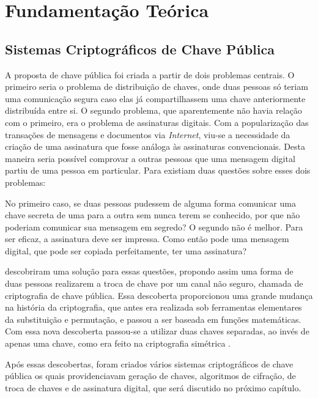 \chapter[Fundamentação Teórica]{Fundamentação Teórica}
\section{Sistemas Criptográficos de Chave Pública}

A proposta de chave pública foi criada a partir de dois problemas centrais. O primeiro seria o problema de distribuição de chaves, onde duas pessoas só teriam uma comunicação segura caso elas já compartilhassem uma chave anteriormente distribuída entre si. O segundo problema, que aparentemente não havia relação com o primeiro, era o problema de assinaturas digitais. Com a popularização das transações de mensagens e documentos via \textit{Internet}, viu-se a necessidade da criação de uma assinatura que fosse análoga às assinaturas convencionais. Desta maneira seria possível comprovar a outras pessoas que uma mensagem digital partiu de uma pessoa em particular. Para  existiam duas questões sobre esses dois problemas:

\begin{citacao}
No primeiro caso, se duas pessoas pudessem de alguma forma comunicar uma chave secreta de uma para a outra sem nunca terem se conhecido, por que não poderiam comunicar sua mensagem em segredo? O segundo não é melhor. Para ser eficaz, a assinatura deve ser impressa. Como então pode uma mensagem digital, que pode ser copiada perfeitamente, ter uma assinatura?
\end{citacao}

 descobriram uma solução para essas questões, propondo assim uma forma de duas pessoas realizarem a troca de chave por um canal não seguro, chamada de criptografia de chave pública. Essa descoberta proporcionou uma grande mudança na história da criptografia, que antes era realizada sob ferramentas elementares da substituição e permutação, e passou a ser baseada em funções matemáticas. Com essa nova descoberta passou-se a utilizar duas chaves separadas, ao invés de apenas uma chave, como era feito na criptografia simétrica \cite{stallings2014}.

Após essas descobertas, foram criados vários sistemas criptográficos de chave pública os quais providenciavam geração de chaves, algoritmos de cifração, de troca de chaves e de assinatura digital, que será discutido no próximo capítulo.


